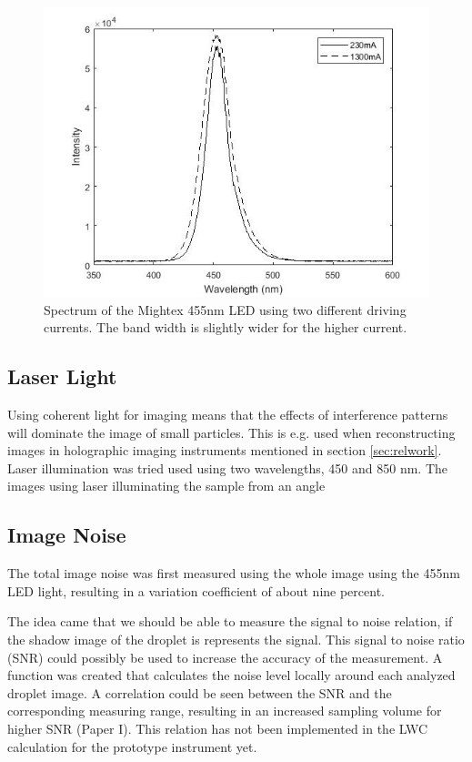 \begin{figure}%
\centering\includegraphics[width=0.6\linewidth]{figures/spektralanalys_mightex455nm}
\caption{Spectrum of the Mightex 455nm LED using two different driving currents. The band width is slightly wider for the higher current.}
\label{fig:ledspectrum}
\end{figure}

\subsection{Laser Light}

Using coherent light for imaging means that the effects of interference patterns will dominate the image of small particles. This is e.g. used when reconstructing images in holographic imaging instruments mentioned in section \ref{sec:relwork}. Laser illumination was tried used using two wavelengths, 450 and 850 nm. The images using laser illuminating the sample from an angle 

\subsection{Image Noise}

The total image noise was first measured using the whole image using the 455nm LED light, resulting in a variation coefficient of about nine percent.

The idea came that we should be able to measure the signal to noise relation, if the shadow image of the droplet is represents the signal. This signal to noise ratio (SNR) could possibly be used to increase the accuracy of the measurement. A function was created that calculates the noise level locally around each analyzed droplet image. A correlation could be seen between the SNR and the corresponding measuring range, resulting in an increased sampling volume for higher SNR \cite{ryd2015}(Paper I). This relation has not been implemented in the LWC calculation for the prototype instrument yet.

